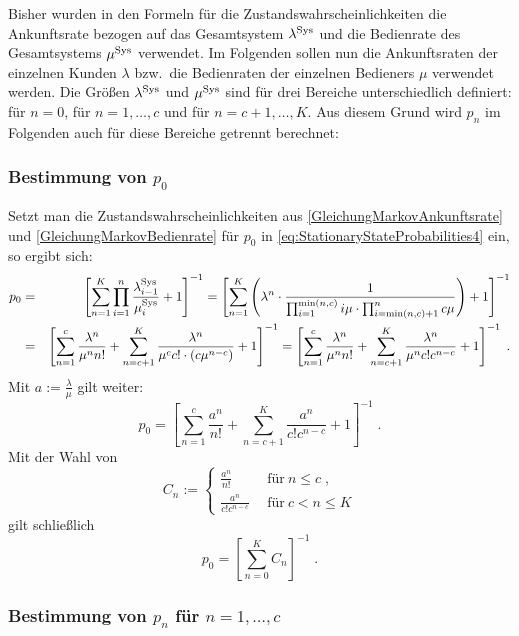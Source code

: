 \documentclass[a4paper,11pt,oneside]{article}
\theoremstyle{definition}
\begin{document}
Bisher wurden in den Formeln für die Zustandswahrscheinlichkeiten die Ankunftsrate bezogen auf das Gesamtsystem $\lambda^{\rm Sys}$ und die Bedienrate des Gesamtsystems $\mu^{\rm Sys}$ verwendet. Im Folgenden sollen nun die Ankunftsraten der einzelnen Kunden $\lambda$ bzw.\ die Bedienraten der einzelnen Bedieners $\mu$ verwendet werden. Die Größen $\lambda^{\rm Sys}$ und $\mu^{\rm Sys}$ sind für drei Bereiche unterschiedlich definiert: für $n=0$, für $n=1,\ldots,c$ und für $n=c+1,\ldots,K$. Aus diesem Grund wird $p_n$ im Folgenden auch für diese Bereiche getrennt berechnet:

\subsubsection*{Bestimmung von $p_0$}

Setzt man die Zustandswahrscheinlichkeiten aus \eqref{GleichungMarkovAnkunftsrate} und \eqref{GleichungMarkovBedienrate} für $p_0$ in \eqref{eq:StationaryStateProbabilities4} ein, so ergibt sich:
\begin{eqnarray*}
p_0&=&
\left[\sum_{n=1}^K\prod_{i=1}^n\frac{\lambda_{i-1}^{\rm Sys}}{\mu_i^{\rm Sys}}+1\right]^{-1} =
\left[\sum_{n=1}^K\left(
\lambda^n\cdot\frac{1}{\prod_{i=1}^{\min(n,c)}i\mu\cdot\prod_{i=\min(n,c)+1}^nc\mu}
\right)+1\right]^{-1}\\&=&
\left[\sum_{n=1}^c\frac{\lambda^n}{\mu^nn!}+\sum_{n=c+1}^K\frac{\lambda^n}{\mu^cc!\cdot(c\mu^{n-c})}+1\right]^{-1} =
\left[\sum_{n=1}^c\frac{\lambda^n}{\mu^nn!}+\sum_{n=c+1}^K\frac{\lambda^n}{\mu^nc!c^{n-c}}+1\right]^{-1}\;.
\end{eqnarray*}
Mit $a:=\frac{\lambda}{\mu}$ gilt weiter:
$$
p_0=
\left[\sum_{n=1}^c\frac{a^n}{n!}+\sum_{n=c+1}^K\frac{a^n}{c!c^{n-c}}+1\right]^{-1}\;.
$$
Mit der Wahl von
\begin{equation}\label{MathematikErlangCn}
C_n:=\left\{\begin{array}{ll}
\displaystyle \frac{a^n}{n!}&~~\textrm{für}~n\le c\;,\\
\displaystyle \frac{a^n}{c!c^{n-c}}&~~\textrm{für}~c<n\le K
\end{array}\right.
\end{equation}
gilt schließlich
$$
p_0=\left[\sum_{n=0}^KC_n\right]^{-1}\;.
$$

\subsubsection*{Bestimmung von $p_n$ für $n=1,\ldots,c$}
\end{document}
